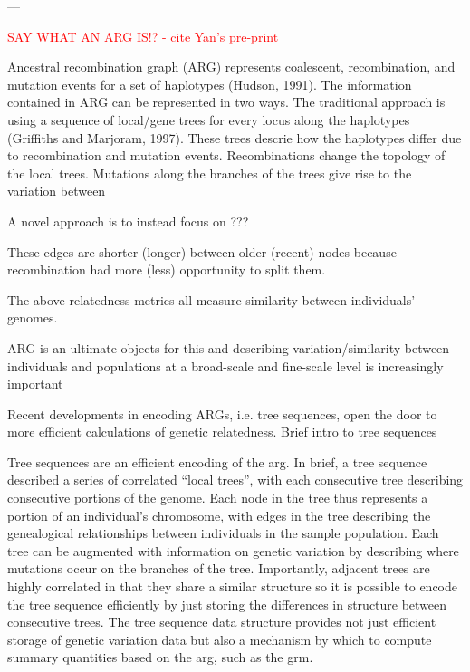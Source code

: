 ---

\textcolor{red}{SAY WHAT AN ARG IS!? - cite Yan's pre-print}

Ancestral recombination graph (ARG) represents coalescent, recombination, and mutation events for a set of haplotypes (Hudson, 1991). The information contained in ARG can be represented in two ways. The traditional approach is using a 
sequence of local/gene trees for every locus along the haplotypes (Griffiths and Marjoram, 1997). These trees descrie how the haplotypes differ due to recombination and mutation events. Recombinations change the topology of the local trees. Mutations along the branches of the trees give rise to the variation between

A novel approach is to instead focus on ???

These edges are shorter (longer) between older (recent) nodes because recombination had more (less) opportunity to split them.

The above relatedness metrics all measure similarity between individuals' genomes.

ARG is an ultimate objects for this and describing variation/similarity between individuals and populations at a broad-scale and fine-scale level is increasingly important

Recent developments in encoding ARGs, i.e. tree sequences, open the door to more efficient calculations of genetic relatedness. Brief intro to tree sequences

Tree sequences are an efficient encoding of the \gls{arg}.
In brief, a tree sequence described a series of correlated ``local trees'', with each consecutive tree describing consecutive portions of the genome.
Each node in the tree thus represents a portion of an individual's chromosome, with edges in the tree describing the genealogical relationships between individuals in the sample population.
Each tree can be augmented with information on genetic variation by describing where mutations occur on the branches of the tree.
Importantly, adjacent trees are highly correlated in that they share a similar structure so it is possible to encode the tree sequence efficiently by just storing the differences in structure between consecutive trees.
The tree sequence data structure provides not just efficient storage of genetic variation data but also a mechanism by which to compute summary quantities based on the \gls{arg}, such as the \gls{grm}.

